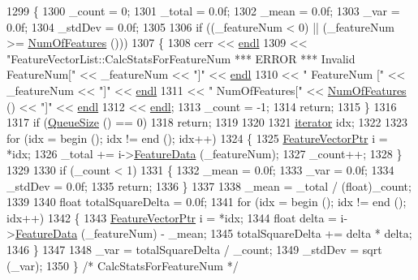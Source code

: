 \begin{DoxyCode}
1299 \{
1300   \_count  = 0;
1301   \_total  = 0.0f;
1302   \_mean   = 0.0f;
1303   \_var    = 0.0f;
1304   \_stdDev = 0.0f;
1305 
1306   \textcolor{keywordflow}{if}  ((\_featureNum < 0)  ||  (\_featureNum >= \hyperlink{class_k_k_m_l_l_1_1_feature_vector_list_a9b14c44e69c63c7680547f0675ab3e7a}{NumOfFeatures} ()))
1307   \{
1308     cerr << \hyperlink{namespace_k_k_b_ad1f50f65af6adc8fa9e6f62d007818a8}{endl}
1309          << \textcolor{stringliteral}{"FeatureVectorList::CalcStatsForFeatureNum    *** ERROR ***  Invalid FeatureNum["} << 
      \_featureNum << \textcolor{stringliteral}{"]"} << \hyperlink{namespace_k_k_b_ad1f50f65af6adc8fa9e6f62d007818a8}{endl}
1310          << \textcolor{stringliteral}{"                                            FeatureNum   ["} << \_featureNum      << \textcolor{stringliteral}{"]"} << 
      \hyperlink{namespace_k_k_b_ad1f50f65af6adc8fa9e6f62d007818a8}{endl}
1311          << \textcolor{stringliteral}{"                                            NumOfFeatures["} << 
      \hyperlink{class_k_k_m_l_l_1_1_feature_vector_list_a9b14c44e69c63c7680547f0675ab3e7a}{NumOfFeatures} () << \textcolor{stringliteral}{"]"} << \hyperlink{namespace_k_k_b_ad1f50f65af6adc8fa9e6f62d007818a8}{endl}
1312          << \hyperlink{namespace_k_k_b_ad1f50f65af6adc8fa9e6f62d007818a8}{endl};
1313     \_count = -1;
1314     \textcolor{keywordflow}{return};
1315   \}
1316 
1317   \textcolor{keywordflow}{if}  (\hyperlink{class_k_k_b_1_1_k_k_queue_a1dab601f75ee6a65d97f02bddf71c40d}{QueueSize} () == 0)
1318     \textcolor{keywordflow}{return};
1319     
1320 
1321   \hyperlink{class_k_k_b_1_1_k_k_queue_aa3c2796a726eea468b94132a9fbf2cfe}{iterator}  idx;
1322 
1323   \textcolor{keywordflow}{for}  (idx = begin (); idx != end ();  idx++)
1324   \{
1325     \hyperlink{class_k_k_m_l_l_1_1_feature_vector}{FeatureVectorPtr}  i = *idx;
1326     \_total += i->\hyperlink{class_k_k_m_l_l_1_1_feature_vector_af055b7c725a4d80a31cd2f6606cc37b6}{FeatureData} (\_featureNum);
1327     \_count++;
1328   \}
1329 
1330   \textcolor{keywordflow}{if}  (\_count < 1)
1331   \{
1332     \_mean   = 0.0f;
1333     \_var    = 0.0f;
1334     \_stdDev = 0.0f;
1335     \textcolor{keywordflow}{return};
1336   \}
1337 
1338   \_mean = \_total / (float)\_count;
1339 
1340   \textcolor{keywordtype}{float}  totalSquareDelta = 0.0f;
1341   \textcolor{keywordflow}{for}  (idx = begin (); idx != end ();  idx++)
1342   \{
1343     \hyperlink{class_k_k_m_l_l_1_1_feature_vector}{FeatureVectorPtr}  i = *idx;
1344     \textcolor{keywordtype}{float}  delta = i->\hyperlink{class_k_k_m_l_l_1_1_feature_vector_af055b7c725a4d80a31cd2f6606cc37b6}{FeatureData} (\_featureNum) - \_mean;
1345     totalSquareDelta += delta * delta;
1346   \}
1347 
1348   \_var     = totalSquareDelta / \_count;
1349   \_stdDev  = sqrt (\_var);
1350 \}  \textcolor{comment}{/* CalcStatsForFeatureNum */}
\end{DoxyCode}
